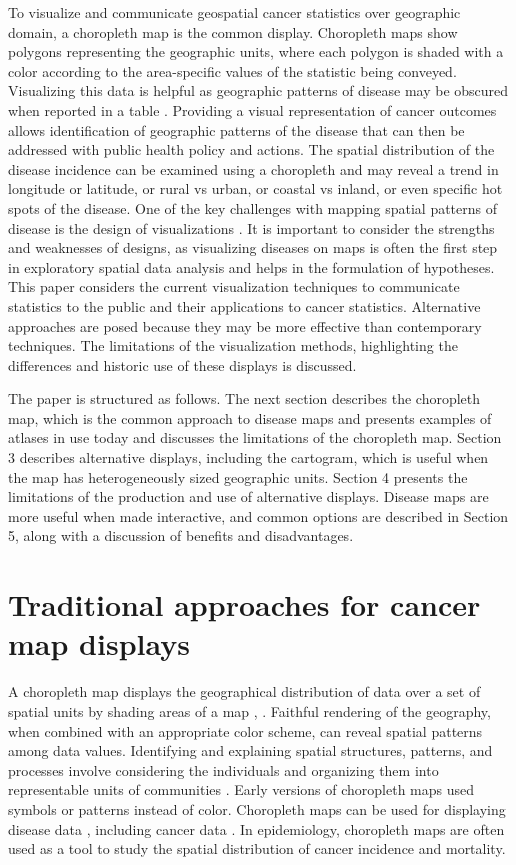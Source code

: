 \documentclass{monashthesis}
\begin{document}
To visualize and communicate geospatial cancer statistics over geographic domain, a choropleth map is the common display. Choropleth maps show polygons representing the geographic units, where each polygon is shaded with a color according to the area-specific values of the statistic being conveyed. Visualizing this data is helpful as geographic patterns of disease may be obscured when reported in a table \autocite{SAMGIS}. Providing a visual representation of cancer outcomes allows identification of geographic patterns of the disease that can then be addressed with public health policy and actions. The spatial distribution of the disease incidence can be examined using a choropleth and may reveal a trend in longitude or latitude, or rural vs urban, or coastal vs inland, or even specific hot spots of the disease. One of the key challenges with mapping spatial patterns of disease is the design of visualizations \autocite{SE}. It is important to consider the strengths and weaknesses of designs, as visualizing diseases on maps is often the first step in exploratory spatial data analysis and helps in the formulation of hypotheses. This paper considers the current visualization techniques to communicate statistics to the public and their applications to cancer statistics. Alternative approaches are posed because they may be more effective than contemporary techniques. The limitations of the visualization methods, highlighting the differences and historic use of these displays is discussed.

The paper is structured as follows. The next section describes the choropleth map, which is the common approach to disease maps and presents examples of atlases in use today and discusses the limitations of the choropleth map. Section 3 describes alternative displays, including the cartogram, which is useful when the map has heterogeneously sized geographic units. Section 4 presents the limitations of the production and use of alternative displays. Disease maps are more useful when made interactive, and common options are described in Section 5, along with a discussion of benefits and disadvantages.

\hypertarget{choropleth-maps}{%
\section{Traditional approaches for cancer map displays}\label{choropleth-maps}}

A choropleth map displays the geographical distribution of data over a set of spatial units by shading areas of a map \autocite{EI}, \autocite{BCM}. Faithful rendering of the geography, when combined with an appropriate color scheme, can reveal spatial patterns among data values. Identifying and explaining spatial structures, patterns, and processes involve considering the individuals and organizing them into representable units of communities \autocite{SAMGIS}. Early versions of choropleth maps used symbols or patterns instead of color. Choropleth maps can be used for displaying disease data \autocite{DMAHP}, including cancer data \autocite{CPISACA}. In epidemiology, choropleth maps are often used as a tool to study the spatial distribution of cancer incidence and mortality.
\end{document}
